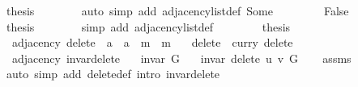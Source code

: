 \begin{isabellebody}
\ {\isacharquery}{\kern0pt}thesis\isanewline
\ \ \ \ \ \ \isamarkupfalse%
\ {\isacharparenleft}{\kern0pt}auto\ simp\ add{\isacharcolon}{\kern0pt}\ adjacency{\isacharunderscore}{\kern0pt}list{\isacharunderscore}{\kern0pt}def\ Some{\isacharparenright}{\kern0pt}\isanewline
\ \ \isamarkupfalse%
\isanewline
\ \ \ \ \isamarkupfalse%
\ False\isanewline
\ \ \ \ \isamarkupfalse%
\ \isamarkupfalse%
\ {\isacharquery}{\kern0pt}thesis\isanewline
\ \ \ \ \ \ \isamarkupfalse%
\ {\isacharparenleft}{\kern0pt}simp\ add{\isacharcolon}{\kern0pt}\ adjacency{\isacharunderscore}{\kern0pt}list{\isacharunderscore}{\kern0pt}def{\isacharparenright}{\kern0pt}\isanewline
\ \ \isamarkupfalse%
\isanewline
\ \ \isamarkupfalse%
\ \isamarkupfalse%
\ {\isacharquery}{\kern0pt}thesis\isanewline
\ \ \ \ \isacommand{{\isachardot}{\kern0pt}}\isamarkupfalse%
\isanewline
{}\isamarkupfalse%
%
\endisatagproof
{\isafoldproof}%
%
\isadelimproof
\isanewline
%
\endisadelimproof
\isanewline
{}\isamarkupfalse%
\ {\isacharparenleft}{\kern0pt}\ adjacency{\isacharparenright}{\kern0pt}\ delete{\isacharprime}{\kern0pt}\ {\isacharcolon}{\kern0pt}{\isacharcolon}{\kern0pt}\ {\isachardoublequoteopen}{\isacharprime}{\kern0pt}a\ {\isasymRightarrow}\ {\isacharprime}{\kern0pt}a\ {\isasymRightarrow}\ {\isacharprime}{\kern0pt}m\ {\isasymRightarrow}\ {\isacharprime}{\kern0pt}m{\isachardoublequoteclose}\ \isanewline
\ \ {\isachardoublequoteopen}delete{\isacharprime}{\kern0pt}\ {\isasymequiv}\ curry\ delete{\isachardoublequoteclose}\isanewline
\isanewline
{}\isamarkupfalse%
\ {\isacharparenleft}{\kern0pt}\ adjacency{\isacharparenright}{\kern0pt}\ invar{\isacharunderscore}{\kern0pt}delete{\isacharprime}{\kern0pt}{\isacharcolon}{\kern0pt}\isanewline
\ \ \ {\isachardoublequoteopen}invar\ G{\isachardoublequoteclose}\isanewline
\ \ \ {\isachardoublequoteopen}invar\ {\isacharparenleft}{\kern0pt}delete{\isacharprime}{\kern0pt}\ u\ v\ G{\isacharparenright}{\kern0pt}{\isachardoublequoteclose}\isanewline
%
\isadelimproof
\ \ %
\endisadelimproof
%
\isatagproof
{}\isamarkupfalse%
\ assms\isanewline
\ \ \isamarkupfalse%
\ {\isacharparenleft}{\kern0pt}auto\ simp\ add{\isacharcolon}{\kern0pt}\ delete{\isacharprime}{\kern0pt}{\isacharunderscore}{\kern0pt}def\ intro{\isacharcolon}{\kern0pt}\ invar{\isacharunderscore}{\kern0pt}delete{\isacharparenright}{\kern0pt}%

\end{isabellebody}
